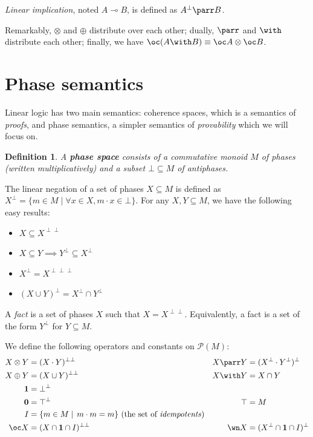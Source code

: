 \documentclass[11pt]{article}
\newtheorem{definition}{Definition}[section]
\newcommand\0{\textbf{0}}
\newcommand\1{\textbf{1}}
\newcommand\biperp{{\perp\perp}}
\newcommand\triperp{{\perp\perp\perp}}
\begin{document}
\emph{Linear implication}, noted $A \multimap B$, is defined as $A^\perp \parr B$.

Remarkably, $\otimes$ and $\oplus$ distribute over each other; dually,
$\parr$ and $\with$ distribute each other; finally, we have $\oc (A \with B) \equiv \oc A \otimes \oc B$.

\section{\label{sec:phase_semantics}Phase semantics}

Linear logic has two main semantics: coherence spaces, which is a semantics of \emph{proofs}, and phase semantics,
a simpler semantics of \emph{provability} which we will focus on.

\begin{definition}
    A \textbf{phase space} consists of a commutative monoid $M$ of \emph{phases} (written multiplicatively)
    and a subset $\bot \subseteq M$ of \emph{antiphases}.
\end{definition}

The linear negation of a set of phases $X \subseteq M$ is defined as $X^\perp = \{m \in M \mid \forall x \in X, m \cdot x \in \bot\}$.
For any $X, Y \subseteq M$, we have the following easy results:
\begin{itemize}
    \item $X \subseteq X^\biperp$
    \item $X \subseteq Y \implies Y^\perp \subseteq X^\perp$
    \item $X^\perp = X^\triperp$
    \item $(X \cup Y)^\perp = X^\perp \cap Y^\perp$
\end{itemize}

A \emph{fact} is a set of phases $X$ such that $X = X^\biperp$. Equivalently, a fact is a set of the form $Y^\perp$
for $Y \subseteq M$.

We define the following operators and constants on $\mathcal P(M)$:
\begin{align*}
    X \otimes Y &= (X \cdot Y)^\biperp & X \parr Y &= (X^\perp \cdot Y^\perp)^\perp \\
    X \oplus Y &= (X \cup Y)^\biperp & X \with Y &= X \cap Y \\
    \1 &= \bot^\perp \\
    \0 &= \top^\perp & \top &= M \\
    I &= \{m \in M \mid\, m\cdot m = m\}\text{ (the set of \textit{idempotents})} \\
    \oc X &= (X \cap \1 \cap I)^\biperp & \wn X &= (X^\perp \cap \1 \cap I)^\perp
\end{align*}
\end{document}
